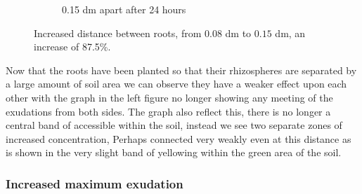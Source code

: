\documentclass[11pt]{article}
\numberwithin{equation}{section}
\begin{document}
\begin{figure}
\begin{subfigure}[t]{0.35\textwidth}
     \caption{0.15 dm apart  after 24 hours}
     \end{subfigure}
     \caption{Increased distance between roots, from $0.08$ dm to $0.15$ dm, an increase of 87.5\%.}
 \end{figure}
 Now that the roots have been planted so that their rhizospheres are separated by a large amount of soil area we can observe they have a weaker effect upon each other with the  graph in the left figure no longer showing any meeting of the exudations from both sides. The  graph also reflect this, there is no longer a central band of accessible  within the soil, instead we see two separate zones of increased  concentration, Perhaps connected very weakly even at this distance as is shown in the very slight band of yellowing within the green area of the soil.
\subsubsection{Increased maximum  exudation}
\end{document}
